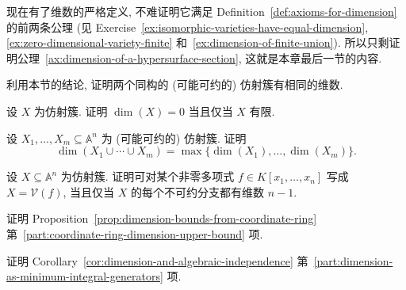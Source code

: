 现在有了维数的严格定义, 不难证明它满足 Definition~\ref{def:axioms-for-dimension} 的前两条公理 (见 Exercise~\ref{ex:isomorphic-varieties-have-equal-dimension}, \ref{ex:zero-dimensional-variety-finite} 和~\ref{ex:dimension-of-finite-union}). 所以只剩证明公理~\ref{ax:dimension-of-a-hypersurface-section}, 这就是本章最后一节的内容.

\BookExerciseHeading
\begin{BookExercises}
  \item\label{ex:isomorphic-varieties-have-equal-dimension} 利用本节的结论, 证明两个同构的 (可能可约的) 仿射簇有相同的维数.
  \item\label{ex:zero-dimensional-variety-finite} 设 $X$ 为仿射簇. 证明 $\dim(X)=0$ 当且仅当 $X$ 有限.
  \item\label{ex:dimension-of-finite-union} 设 $X_{1},\ldots,X_{m}\subseteq\mathbb{A}^{n}$ 为 (可能可约的) 仿射簇. 证明
  \[
    \dim(X_{1}\cup\cdots\cup X_{m})=\max\{\dim(X_{1}),\ldots,\dim(X_{m})\}.
  \]
  \item\label{ex:characterization-of-hypersurfaces} 设 $X\subseteq\mathbb{A}^{n}$ 为仿射簇. 证明可对某个非零多项式 $f\in K[x_{1},\ldots,x_{n}]$ 写成 $X=\mathcal{V}(f)$, 当且仅当 $X$ 的每个不可约分支都有维数 $n-1$.
  \item\label{ex:prove-dimension-upper-bound-by-integrality} 证明 Proposition~\ref{prop:dimension-bounds-from-coordinate-ring} 第~\ref{part:coordinate-ring-dimension-upper-bound} 项.
  \item\label{ex:prove-dimension-minimum-integral-generators} 证明 Corollary~\ref{cor:dimension-and-algebraic-independence} 第~\ref{part:dimension-as-minimum-integral-generators} 项.
\end{BookExercises}
